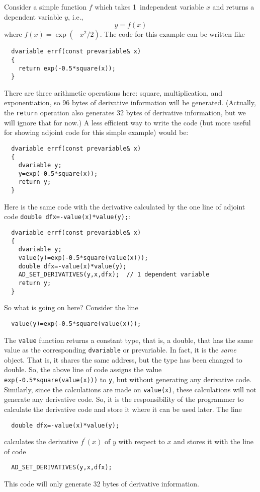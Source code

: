 Consider a simple function $f$ which takes 1~independent variable $x$
and returns a dependent variable $y$, i.e.,
$$y=f(x)$$
where $f(x)=\exp(-x^2/2)$. The code for this example can be written like
\begin{lstlisting}
  dvariable errf(const prevariable& x)
  {
    return exp(-0.5*square(x));
  }
\end{lstlisting}
There are three arithmetic operations here: square, multiplication, and exponentiation,
so 96 bytes of derivative information will be generated. (Actually, the \texttt{return} operation
also generates 32 bytes of derivative information, but we will ignore that for now.)
A less efficient way to write the code (but more useful for 
showing adjoint code for this simple example) would be:
\begin{lstlisting}
  dvariable errf(const prevariable& x)
  {
    dvariable y;
    y=exp(-0.5*square(x));
    return y;
  }
\end{lstlisting}
Here is the same code with the derivative calculated by the one line of adjoint
code \texttt{double dfx=-value(x)*value(y);}:
\begin{lstlisting}
  dvariable errf(const prevariable& x)
  {
    dvariable y;
    value(y)=exp(-0.5*square(value(x)));
    double dfx=-value(x)*value(y);
    AD_SET_DERIVATIVES(y,x,dfx);  // 1 dependent variable 
    return y;
  }
\end{lstlisting}
So what is going on here? Consider the line
\begin{lstlisting}
  value(y)=exp(-0.5*square(value(x))); 
\end{lstlisting}
The \texttt{value} function returns a constant type, that is, a double, 
that has the same value as the corresponding \texttt{dvariable} or prevariable.
In fact, it is the {\it same} object.  That is, it shares the same address,
but the type has been changed to double. So, the above line of
code assigns the value \texttt{exp(-0.5*square(value(x)))} to \texttt{y},
but without generating any derivative code. Similarly, since
the calculations are made on \texttt{value(x)}, these calculations
will not generate any derivative code. So, it is the responsibility of the
programmer to calculate the derivative code and store it where it
can be used later. The line
\begin{lstlisting}
  double dfx=-value(x)*value(y);
\end{lstlisting}
calculates the derivative $f^\prime(x)$
of $y$ with respect to $x$ and stores it with the line of code
\begin{lstlisting}
  AD_SET_DERIVATIVES(y,x,dfx);
\end{lstlisting}
This code will only generate 32 bytes of derivative information.


